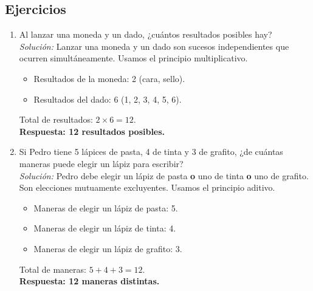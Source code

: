 \documentclass[12pt, letterpaper]{article}
\begin{document}
\subsection{Ejercicios}
\begin{enumerate}
	\item Al lanzar una moneda y un dado, ¿cuántos resultados posibles hay? \\
	      \textit{Solución:}
	      Lanzar una moneda y un dado son sucesos independientes que ocurren simultáneamente. Usamos el principio multiplicativo.
	      \begin{itemize}
		      \item Resultados de la moneda: 2 (cara, sello).
		      \item Resultados del dado: 6 (1, 2, 3, 4, 5, 6).
	      \end{itemize}
	      Total de resultados: $2 \times 6 = 12$. \\
	      \textbf{Respuesta: 12 resultados posibles.}

	\item Si Pedro tiene 5 lápices de pasta, 4 de tinta y 3 de grafito, ¿de cuántas maneras puede elegir un lápiz para escribir? \\
	      \textit{Solución:}
	      Pedro debe elegir un lápiz de pasta \textbf{o} uno de tinta \textbf{o} uno de grafito. Son elecciones mutuamente excluyentes. Usamos el principio aditivo.
	      \begin{itemize}
		      \item Maneras de elegir un lápiz de pasta: 5.
		      \item Maneras de elegir un lápiz de tinta: 4.
		      \item Maneras de elegir un lápiz de grafito: 3.
	      \end{itemize}
	      Total de maneras: $5 + 4 + 3 = 12$. \\
	      \textbf{Respuesta: 12 maneras distintas.}


\end{enumerate}
\end{document}
